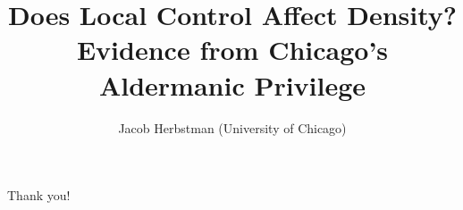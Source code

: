 \documentclass[11pt,notes=hide,aspectratio=169,mathserif]{beamer}
\title[Aldermanic Privilege]{Does Local Control Affect Density? Evidence from Chicago's Aldermanic Privilege}
\author[Jacob Herbstman]{Jacob Herbstman (University of Chicago)}
\date{\monthname[\the\month] \the\year}
\begin{document}
\begin{frame}[plain]
\titlepage
\note{
	\begin{itemize}
	\end{itemize}
}
\end{frame}








\begin{frame}[plain]
    \begin{center}{\LARGE Thank you!}\end{center}
    \end{frame}

\appendix

\begin{frame}[allowframebreaks]{}
    
    
\end{frame}







%
\end{document}
